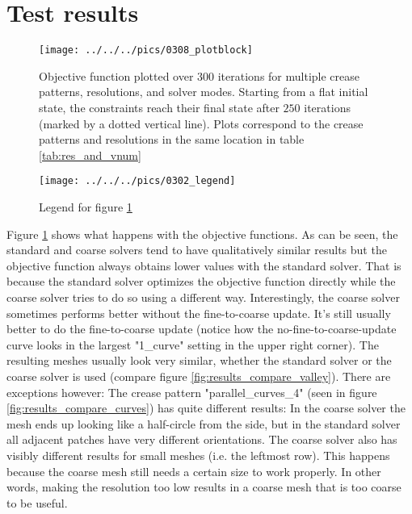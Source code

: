 \documentclass[a4paper,twoside,12pt,nochapterprefix]{scrbook}
\begin{document}
\section{Test results}
\begin{figure}
    \centering
    \texttt{[image: ../../../pics/0308\_plotblock]}
    \caption{Objective function plotted over $300$ iterations for multiple crease patterns, resolutions, and solver modes. Starting from a flat initial state, the constraints reach their final state after $250$ iterations (marked by a dotted vertical line). Plots correspond to the crease patterns and resolutions in the same location in table \ref{tab:res_and_vnum}}
      \label{fig:results_plotblock}
\end{figure}
\begin{figure}
    \centering
    \texttt{[image: ../../../pics/0302\_legend]}
    \caption{Legend for figure \ref{fig:results_plotblock}}
    \label{fig:results_legend}
\end{figure}
Figure \ref{fig:results_plotblock} shows what happens with the objective functions. As can be seen, the standard and coarse solvers tend to have qualitatively similar results but the objective function always obtains lower values with the standard solver. That is because the standard solver optimizes the objective function directly while the coarse solver tries to do so using a different way. Interestingly, the coarse solver sometimes performs better without the fine-to-coarse update. It's still usually better to do the fine-to-coarse update (notice how the no-fine-to-coarse-update curve looks in the largest "1\_curve" setting in the upper right corner).\newline
The resulting meshes usually look very similar, whether the standard solver or the coarse solver is used (compare figure \ref{fig:results_compare_valley}). There are exceptions however: The crease pattern "parallel\_curves\_4" (seen in figure \ref{fig:results_compare_curves}) has quite different results: In the coarse solver the mesh ends up looking like a half-circle from the side, but in the standard solver all adjacent patches have very different orientations.\newline %
The coarse solver also has visibly different results for small meshes (i.e. the leftmost row). This happens because the coarse mesh still needs a certain size to work properly. In other words, making the resolution too low results in a coarse mesh that is too coarse to be useful.\newline
\end{document}
